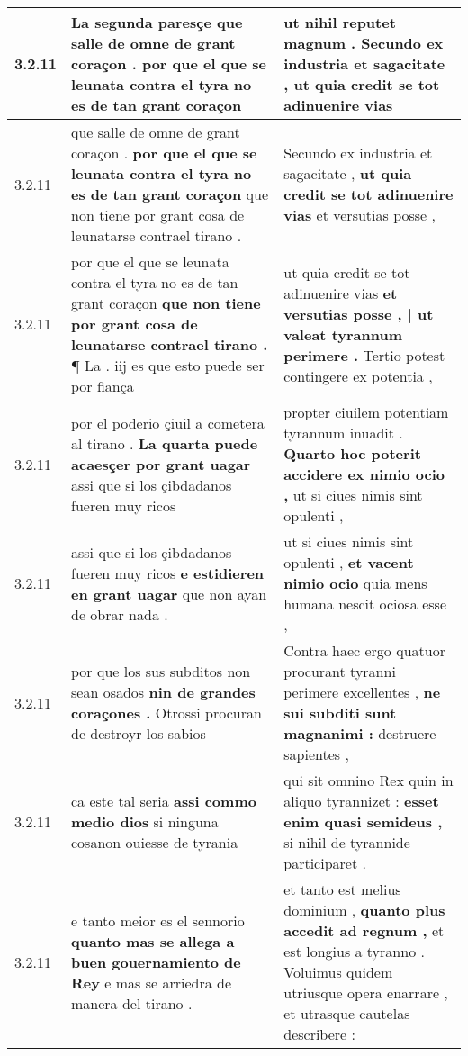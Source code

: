 \begin{tabular}{|p{1cm}|p{6.5cm}|p{6.5cm}|}
3.2.11 & La segunda paresçe \textbf{ que salle de omne de grant coraçon . } por que el que se leunata contra el tyra no es de tan grant coraçon & ut nihil reputet magnum . \textbf{ Secundo ex industria et sagacitate , } ut quia credit se tot adinuenire vias \\\hline
3.2.11 & que salle de omne de grant coraçon . \textbf{ por que el que se leunata contra el tyra no es de tan grant coraçon } que non tiene por grant cosa de leunatarse contrael tirano . & Secundo ex industria et sagacitate , \textbf{ ut quia credit se tot adinuenire vias } et versutias posse , \\\hline
3.2.11 & por que el que se leunata contra el tyra no es de tan grant coraçon \textbf{ que non tiene por grant cosa de leunatarse contrael tirano . } ¶ La . iij es que esto puede ser por fiança & ut quia credit se tot adinuenire vias \textbf{ et versutias posse , | ut valeat tyrannum perimere . } Tertio potest contingere ex potentia , \\\hline
3.2.11 & por el poderio çiuil a cometera al tirano . \textbf{ La quarta puede acaesçer por grant uagar } assi que si los çibdadanos fueren muy ricos & propter ciuilem potentiam tyrannum inuadit . \textbf{ Quarto hoc poterit accidere ex nimio ocio , } ut si ciues nimis sint opulenti , \\\hline
3.2.11 & assi que si los çibdadanos fueren muy ricos \textbf{ e estidieren en grant uagar } que non ayan de obrar nada . & ut si ciues nimis sint opulenti , \textbf{ et vacent nimio ocio } quia mens humana nescit ociosa esse , \\\hline
3.2.11 & por que los sus subditos non sean osados \textbf{ nin de grandes coraçones . } Otrossi procuran de destroyr los sabios & Contra haec ergo quatuor procurant tyranni perimere excellentes , \textbf{ ne sui subditi sunt magnanimi : } destruere sapientes , \\\hline
3.2.11 & ca este tal seria \textbf{ assi commo medio dios } si ninguna cosanon ouiesse de tyrania & qui sit omnino Rex quin in aliquo tyrannizet : \textbf{ esset enim quasi semideus , } si nihil de tyrannide participaret . \\\hline
3.2.11 & e tanto meior es el sennorio \textbf{ quanto mas se allega a buen gouernamiento de Rey } e mas se arriedra de manera del tirano . & et tanto est melius dominium , \textbf{ quanto plus accedit ad regnum , } et est longius a tyranno . Voluimus quidem utriusque opera enarrare , et utrasque cautelas describere : \\\hline

\end{tabular}
